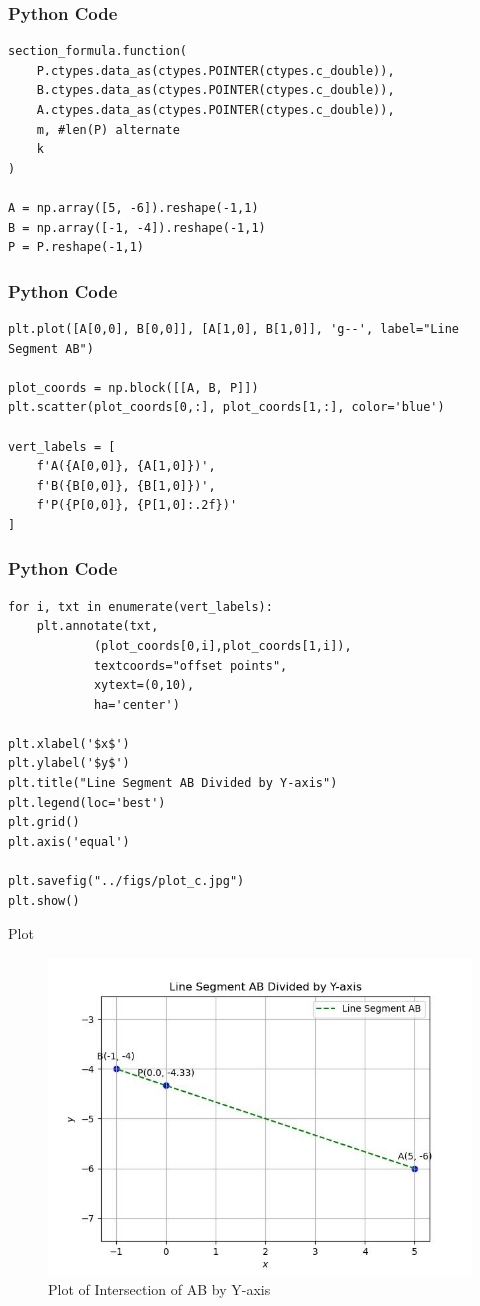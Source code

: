\documentclass{beamer}
\begin{document}
\begin{frame}[fragile]
    \frametitle{Python Code}
    \begin{lstlisting}
section_formula.function(
    P.ctypes.data_as(ctypes.POINTER(ctypes.c_double)),
    B.ctypes.data_as(ctypes.POINTER(ctypes.c_double)),
    A.ctypes.data_as(ctypes.POINTER(ctypes.c_double)),
    m, #len(P) alternate
    k
)

A = np.array([5, -6]).reshape(-1,1)
B = np.array([-1, -4]).reshape(-1,1)
P = P.reshape(-1,1)
    \end{lstlisting}
\end{frame}

\begin{frame}[fragile]
    \frametitle{Python Code}
    \begin{lstlisting}
plt.plot([A[0,0], B[0,0]], [A[1,0], B[1,0]], 'g--', label="Line Segment AB")

plot_coords = np.block([[A, B, P]])
plt.scatter(plot_coords[0,:], plot_coords[1,:], color='blue')

vert_labels = [
    f'A({A[0,0]}, {A[1,0]})',
    f'B({B[0,0]}, {B[1,0]})',
    f'P({P[0,0]}, {P[1,0]:.2f})'
]
    \end{lstlisting}
\end{frame}

\begin{frame}[fragile]
    \frametitle{Python Code}
    \begin{lstlisting}
for i, txt in enumerate(vert_labels):
    plt.annotate(txt,
            (plot_coords[0,i],plot_coords[1,i]),
            textcoords="offset points",
            xytext=(0,10),
            ha='center')

plt.xlabel('$x$')
plt.ylabel('$y$')
plt.title("Line Segment AB Divided by Y-axis")
plt.legend(loc='best')
plt.grid()
plt.axis('equal')

plt.savefig("../figs/plot_c.jpg")
plt.show()
    \end{lstlisting}
\end{frame}

\begin{frame}{Plot}
    \begin{figure}
        \centering
        \includegraphics[width=0.5\columnwidth]{../figs/plot_c.jpg}
        \caption{Plot of Intersection of AB by Y-axis}
        \label{fig:fig}
    \end{figure}
\end{frame}
\end{document}
